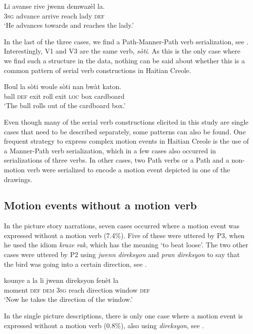 \documentclass[output=paper,colorlinks,citecolor=brown]{langscibook}
\begin{document}
\ea\label{ex:3:65}
\gll  Li avanse rive jwenn demwazèl la. \\
      \textsc{3sg} advance arrive reach lady \textsc{def} \\
\glt ‘He advances towards and reaches the lady.’
\z

In the last of the three cases, we find a Path-Manner-Path verb serialization, see . Interestingly, V1 and V3 are the same verb, \emph{sòti}. As this is the only case where we find such a structure in the data, nothing can be said about whether this is a common pattern of serial verb constructions in Haitian Creole.

\ea\label{ex:3:66}
\gll   Boul la sòti woule sòti nan bwàt katon.\\
       ball \textsc{def} exit roll exit \textsc{loc} box cardboard\\
\glt ‘The ball rolls out of the cardboard box.’
\z

Even though many of the serial verb constructions elicited in this study are single cases that need to be described separately, some patterns can also be found. One frequent strategy to express complex motion events in Haitian Creole is the use of a Manner-Path verb serialization, which in a few cases also occurred in serializations of three verbs. In other cases, two Path verbs or a Path and a non-motion verb were serialized to encode a motion event depicted in one of the drawings. 

\subsection{Motion events without a motion verb}

In the picture story narrations, seven cases occurred where a motion event was expressed without a motion verb (7.4\%). Five of these were uttered by P3, when he used the idiom \emph{kraze rak}, which has the meaning ‘to beat loose’. The two other cases were uttered by P2 using \emph{jwenn direksyon} and \emph{pran direksyon} to say that the bird was going into a certain direction, see .

\ea\label{ex:3:67}
\gll  {{[}…{]}} kounye a la      li jwenn direksyon fenèt la \\
      {}        moment \textsc{def} \textsc{dem} \textsc{3sg} reach direction window \textsc{def}\\
\glt ‘Now he takes the direction of the window.’
\z

In the single picture descriptions, there is only one case where a motion event is expressed without a motion verb (0.8\%), also using \emph{direksyon}, see .
\end{document}
